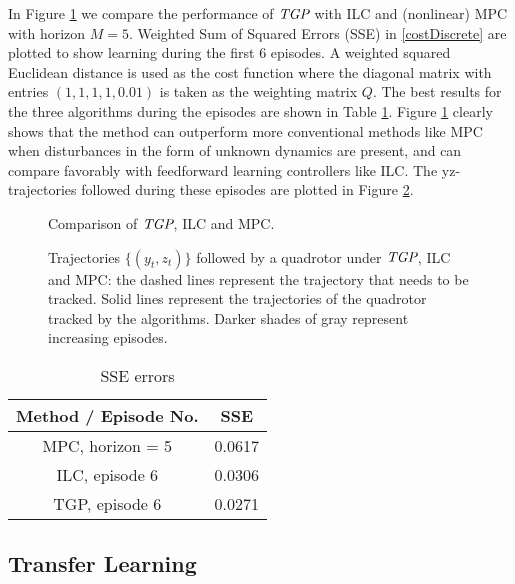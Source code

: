 In Figure \ref{fig:comparison} we compare the performance of $\emph{TGP}$ with ILC and (nonlinear) MPC with horizon $M = 5$. Weighted Sum of Squared Errors (SSE) in \eqref{costDiscrete} are plotted to show learning during the first 6 episodes. A weighted squared Euclidean distance is used as the cost function where the diagonal matrix with entries $(1,1,1,1,0.01)$ is taken as the weighting matrix $Q$. The best results for the three algorithms during the episodes are shown in Table \ref{SSE_errors}. Figure \ref{fig:comparison} clearly shows that the method can outperform more conventional methods like MPC when disturbances in the form of unknown dynamics are present, and can compare favorably with feedforward learning controllers like ILC. The yz-trajectories followed during these episodes are plotted in Figure \ref{fig:trajectories}.

\begin{figure}
\center

\caption{Comparison of $\emph{TGP}$, ILC and MPC.}
\label{fig:comparison}
\end{figure}


\begin{figure}
\center	

\caption{Trajectories $\{(y_t,z_t)\}$ followed by a quadrotor under $\emph{TGP}$, ILC and MPC: the dashed lines represent the trajectory that needs to be tracked. Solid lines represent the trajectories of the quadrotor tracked by the algorithms. Darker shades of gray represent increasing episodes.}
\label{fig:trajectories}
\end{figure}

\begin{table}[h!t]
\renewcommand{\arraystretch}{1.3}
\caption{SSE errors}
\label{SSE_errors}
\centering
\begin{tabular}{cc}
\textbf{Method / Episode No.} & SSE \\
\hline
MPC, horizon = 5 & 0.0617 \\
ILC, episode 6 & 0.0306 \\
TGP, episode 6 & 0.0271 \\
\end{tabular}
\end{table}

\subsection{Transfer Learning}

